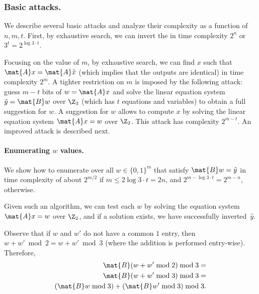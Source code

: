 \subsubsection{Basic attacks.}
We describe several basic attacks and analyze their complexity as a function of $n,m,t$.
First, by exhaustive search, we can invert the \ttOWF in time complexity $2^n$ or $3^t = 2^{\log 3 \cdot t}$.

Focusing on the value of $m$, by exhaustive search, we can find $x$ such that $\mat{A}x = \mat{A}\hat{x}$ (which implies that the outputs are identical) in time complexity $2^m$.
A tighter restriction on $m$ is imposed by the following attack: guess $m - t$ bits of $w = \mat{A}x$ and solve the linear equation system $\hat{y} = \mat{B}w$ over $\Z_3$ (which has $t$ equations and variables) to obtain a full suggestion for $w$. A suggestion for $w$ allows to compute $x$ by solving the linear equation system $\mat{A}x=w$ over $\Z_2$. This attack has complexity $2^{m-t}$. An improved attack is described next.

\paragraph{Enumerating $w$ values.}

We show how to enumerate over all $w \in \{0,1\}^m$ that satisfy $\mat{B} w = \hat{y}$ in time complexity of about $2^{m/2}$ if $m \leq 2 \log 3 \cdot t = 2 n$, and $2^{m - \log 3 \cdot t} = 2^{m - n}$, otherwise.

Given such an algorithm, we can test each $w$ by solving the equation system $\mat{A}x = w$ over $\Z_2$, and if a solution exists, we have successfully inverted~$\hat{y}$.

Observe that if $w$ and $w'$ do not have a common $1$ entry, then $w + w' \bmod 2 = w + w' \bmod 3$
(where the addition is performed entry-wise). Therefore,
\begin{align}
\label{eq:lineara}
\begin{split}
\mat{B}(w + w' \bmod 2) \bmod 3 = \\
\mat{B}(w + w' \bmod 3) \bmod 3 = \\
(\mat{B}w \bmod 3) + (\mat{B}w' \bmod 3) \bmod 3.
\end{split}
\end{align}

